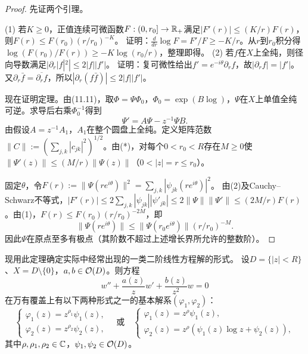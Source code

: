 \begin{proof}
先证两个引理。

(1) 若$K\ge0$，正值连续可微函数$F:(0,r_0]\to\mathbb R_+$满足$|F'(r)|\le(K/r)F(r)$，则$F(r)\le F(r_0)(r/r_0)^{-K}$。
证明：$\frac d{dr}\log F=F'/F\ge-K/r$。从$r$到$r_0$积分得$\log(F(r_0)/F(r))\ge-K\log(r_0/r)$，整理即得。
(2) 若$f$在$X$上全纯，则径向导数满足$|\partial_r|f|^2|\le2|f||f'|$。
证明：复可微性给出$f'=e^{-i\theta}\partial_rf$，故$|\partial_rf|=|f'|$。又$\partial_r\bar f=\overline{\partial_rf}$，所以$|\partial_r(f\bar f)|\le2|f||f'|$。

现在证明定理。由(11.11)，取$\Phi=\Psi\Phi_0$，$\Phi_0=\exp(B\log)$，$\Psi$在$X$上单值全纯可逆。求导后右乘$\Phi_0^{-1}$得到
\begin{equation}\Psi'=A\Psi-z^{-1}\Psi B.\tag{*}\end{equation}
由假设$A=z^{-1}A_1$，$A_1$在整个圆盘上全纯。定义矩阵范数$\|C\|:=(\sum_{j,k}|c_{jk}|^2)^{1/2}$。由(*)，对每个$0<r_0<R$存在$M\ge0$使$\|\Psi'(z)\|\le(M/r)\|\Psi(z)\|$（$0<|z|=r\le r_0$）。

固定$\theta$，令$F(r):=\|\Psi(re^{i\theta})\|^2=\sum_{j,k}|\psi_{jk}(re^{i\theta})|^2$。
由(2)及Cauchy--Schwarz不等式，$|F'(r)|\le2\sum_{j,k}|\psi_{jk}||\psi'_{jk}|\le2\|\Psi\|\|\Psi'\|\le(2M/r)F(r)$。由(1)，$F(r)\le F(r_0)(r/r_0)^{-2M}$，即
\[
\|\Psi(re^{i\theta})\|\le\|\Psi(r_0e^{i\theta})\|(r/r_0)^{-M}.
\]
因此$\Psi$在原点至多有极点（其阶数不超过上述增长界所允许的整数阶）。
\end{proof}
现用此定理确定实际中经常出现的一类二阶线性方程解的形式。
设$D=\{|z|<R\}$、$X=D\setminus\{0\}$，$a,b\in\mathcal O(D)$。则方程
\begin{equation}w''+\frac{a(z)}z w'+\frac{b(z)}{z^2}w=0\tag{1}\end{equation}
在万有覆盖上有以下两种形式之一的基本解系$(\varphi_1,\varphi_2)$：
\[
\begin{cases}\varphi_1(z)=z^{\rho_1}\psi_1(z),\\\varphi_2(z)=z^{\rho_2}\psi_2(z),\end{cases}
\quad\text{或}\quad
\begin{cases}\varphi_1(z)=z^\rho\psi_1(z),\\\varphi_2(z)=z^\rho(\psi_1(z)\log z+\psi_2(z)),\end{cases}
\]
其中$\rho,\rho_1,\rho_2\in\mathbb C$，$\psi_1,\psi_2\in\mathcal O(D)$。


